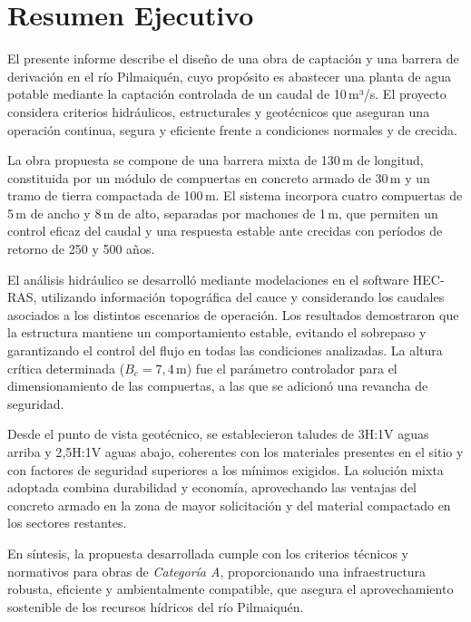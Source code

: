 \documentclass{article} %
\begin{document}
\newpage
\section*{Resumen Ejecutivo}

El presente informe describe el diseño de una obra de captación y una barrera de derivación en el río Pilmaiquén, cuyo propósito es abastecer una planta de agua potable mediante la captación controlada de un caudal de 10\,m³/s. El proyecto considera criterios hidráulicos, estructurales y geotécnicos que aseguran una operación continua, segura y eficiente frente a condiciones normales y de crecida.

La obra propuesta se compone de una barrera mixta de 130\,m de longitud, constituida por un módulo de compuertas en concreto armado de 30\,m y un tramo de tierra compactada de 100\,m. El sistema incorpora cuatro compuertas de 5\,m de ancho y 8\,m de alto, separadas por machones de 1\,m, que permiten un control eficaz del caudal y una respuesta estable ante crecidas con períodos de retorno de 250 y 500 años.

El análisis hidráulico se desarrolló mediante modelaciones en el software HEC-RAS, utilizando información topográfica del cauce y considerando los caudales asociados a los distintos escenarios de operación. Los resultados demostraron que la estructura mantiene un comportamiento estable, evitando el sobrepaso y garantizando el control del flujo en todas las condiciones analizadas. La altura crítica determinada (\(B_c = 7{,}4\,\text{m}\)) fue el parámetro controlador para el dimensionamiento de las compuertas, a las que se adicionó una revancha de seguridad.

Desde el punto de vista geotécnico, se establecieron taludes de 3H:1V aguas arriba y 2{,}5H:1V aguas abajo, coherentes con los materiales presentes en el sitio y con factores de seguridad superiores a los mínimos exigidos. La solución mixta adoptada combina durabilidad y economía, aprovechando las ventajas del concreto armado en la zona de mayor solicitación y del material compactado en los sectores restantes.

En síntesis, la propuesta desarrollada cumple con los criterios técnicos y normativos para obras de \textit{Categoría A}, proporcionando una infraestructura robusta, eficiente y ambientalmente compatible, que asegura el aprovechamiento sostenible de los recursos hídricos del río Pilmaiquén.
\end{document}
